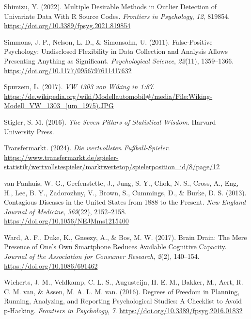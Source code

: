 \documentclass[
  letterpaper,
  oneside,
  open=any]{scrbook}
\newlength{\cslhangindent}
\newenvironment{CSLReferences}[2] %
 {\begin{list}{}{%
  \setlength{\itemindent}{0pt}
  \setlength{\leftmargin}{0pt}
  \setlength{\parsep}{0pt}
  \ifodd #1
   \setlength{\leftmargin}{\cslhangindent}
   \setlength{\itemindent}{-1\cslhangindent}
  \fi
  \setlength{\itemsep}{#2\baselineskip}}}
 {\end{list}}
\theoremstyle{definition}
\theoremstyle{definition}
\theoremstyle{definition}
\theoremstyle{remark}
\begin{document}
\begin{CSLReferences}{1}{0}
Shimizu, Y. (2022). Multiple {Desirable Methods} in {Outlier Detection}
of {Univariate Data With R Source Codes}. \emph{Frontiers in
Psychology}, \emph{12}, 819854.
\url{https://doi.org/10.3389/fpsyg.2021.819854}

Simmons, J. P., Nelson, L. D., \& Simonsohn, U. (2011). False-{Positive
Psychology}: {Undisclosed Flexibility} in {Data Collection} and
{Analysis Allows Presenting Anything} as {Significant}.
\emph{Psychological Science}, \emph{22}(11), 1359--1366.
\url{https://doi.org/10.1177/0956797611417632}

Spurzem, L. (2017). \emph{{VW} 1303 von {Wiking} in 1:87}.
\url{https://de.wikipedia.org/wiki/Modellautomobil\#/media/File:Wiking-Modell_VW_1303_(um_1975).JPG}

Stigler, S. M. (2016). \emph{The Seven Pillars of Statistical Wisdom}.
Harvard University Press.

Transfermarkt. (2024). \emph{Die wertvollsten Fußball-Spieler}.
\url{https://www.transfermarkt.de/spieler-statistik/wertvollstespieler/marktwertetop/spielerposition_id/8/page/12}

van Panhuis, W. G., Grefenstette, J., Jung, S. Y., Chok, N. S., Cross,
A., Eng, H., Lee, B. Y., Zadorozhny, V., Brown, S., Cummings, D., \&
Burke, D. S. (2013). Contagious {Diseases} in the {United States} from
1888 to the {Present}. \emph{New England Journal of Medicine},
\emph{369}(22), 2152--2158. \url{https://doi.org/10.1056/NEJMms1215400}

Ward, A. F., Duke, K., Gneezy, A., \& Bos, M. W. (2017). Brain {Drain}:
{The Mere Presence} of {One}'s {Own Smartphone Reduces Available
Cognitive Capacity}. \emph{Journal of the Association for Consumer
Research}, \emph{2}(2), 140--154. \url{https://doi.org/10.1086/691462}

Wicherts, J. M., Veldkamp, C. L. S., Augusteijn, H. E. M., Bakker, M.,
Aert, R. C. M. van, \& Assen, M. A. L. M. van. (2016). Degrees of
{Freedom} in {Planning}, {Running}, {Analyzing}, and {Reporting
Psychological Studies}: {A Checklist} to {Avoid} p-{Hacking}.
\emph{Frontiers in Psychology}, \emph{7}.
\url{https://doi.org/10.3389/fpsyg.2016.01832}


\end{CSLReferences}
\end{document}
